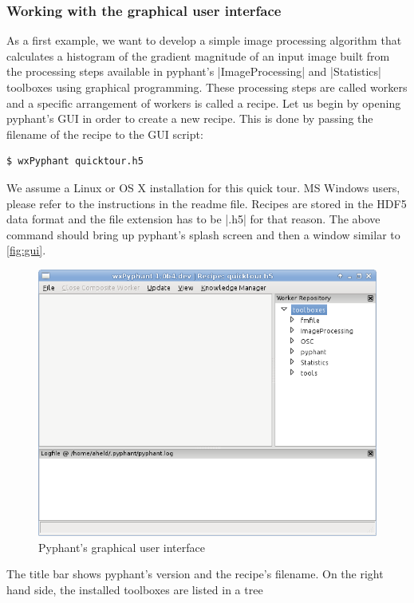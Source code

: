 \documentclass[a4paper]{article}
\begin{document}
\subsubsection{Working with the graphical user interface}
\label{sec:introduction_gui}

As a first example, we want to develop a simple image processing
algorithm that calculates a histogram of the gradient magnitude of an
input image built from the processing steps available in pyphant's
|ImageProcessing| and |Statistics| toolboxes using graphical
programming. These processing steps are called workers and a specific
arrangement of workers is called a recipe. Let us begin by opening
pyphant's GUI in order to create a new recipe. This is done by passing
the filename of the recipe to the GUI script:
\begin{verbatim}
$ wxPyphant quicktour.h5
\end{verbatim}
We assume a Linux or OS X installation for this quick tour. MS Windows
users, please refer to the instructions in the readme
file\cite{wingui}. Recipes are stored in the HDF5\cite{hdf5} data
format and the file extension has to be |.h5| for that
reason. The above command should bring up pyphant's splash
screen and then a window similar to \autoref{fig:gui}.
\begin{figure}[h]
  \centering
  \includegraphics[scale=0.75]{fig/gui.png}
  \caption{Pyphant's graphical user interface}
  \label{fig:gui}
\end{figure}
The title bar shows pyphant's version and the recipe's filename. On
the right hand side, the installed toolboxes are listed in a tree
\end{document}
